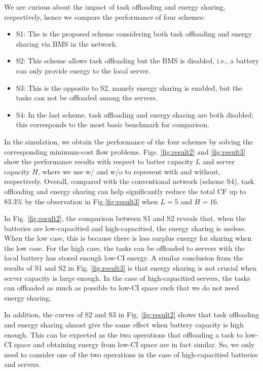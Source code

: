 \documentclass[conference, 10pt, ﬁnal, letterpaper, twocolumn]{IEEEtran}
\begin{document}
We are curious about the impact of task offloading and energy sharing, respectively, hence we compare the performance of four schemes:
\begin{itemize}
    \item S1: The is the proposed scheme considering both task offloading and energy sharing via BMS in the network.
    \item S2: This scheme allows task offloading but the BMS is disabled, i.e., a battery can only provide energy to the local server.
    \item S3: This is the opposite to S2, namely energy sharing is enabled, but the tasks can not be offloaded among the servers.
    \item S4: In the last scheme, task offloading and energy sharing are both disabled; this corresponds to the most basic benchmark for comparison.
\end{itemize}
In the simulation, we obtain the performance of the four schemes by solving the corresponding minimum-cost flow problems. Figs. \ref{fig:result2} and \ref{fig:result3} show the performance results with respect to batter capacity $L$ and server capacity $H$, where we use w/ and w/o to represent with and without, respectively. Overall, compared with the conventional network (scheme S4), task offloading and energy sharing can help significantly reduce the total CF up to $83.3\%$ by the observation in Fig.\ref{fig:result3} when $L = 5$ and $H = 16$.





In Fig. \ref{fig:result2}, the comparison between S1 and S2 reveals that, when the batteries are low-capacitied and high-capacitied, the energy sharing is useless. When the low case, this is because there is less surplus energy for sharing when the low case. For the high case, the tasks can be offloaded to servers with the local battery has stored enough low-CI energy. A similar conclusion from the results of S1 and S2 in Fig. \ref{fig:result3} is that energy sharing is not crucial when server capacity is large enough. In the case of high-capacitied servers, the tasks can offloaded as much as possible to low-CI space such that we do not need energy sharing. 

In addition, the curves of S2 and S3 in Fig. \ref{fig:result2} shows that task offloading and energy sharing almost give the same effect when battery capacity is high enough. This can be expected as the two operations that offloading a task to low-CI space and obtaining energy from low-CI space are in fact similar. So, we only need to consider one of the two operations in the case of high-capacitied batteries and servers.
\end{document}
